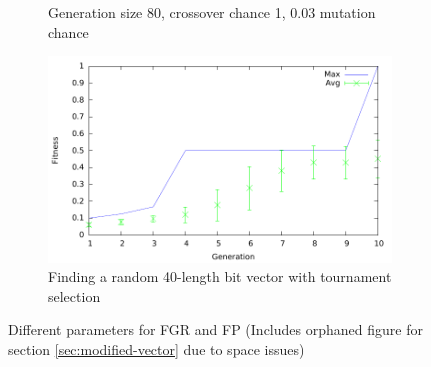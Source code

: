 \begin{figure}[H]
\begin{subfigure}[b]{0.5\textwidth}
                \caption{Generation size 80, crossover chance 1, 0.03 mutation chance}
                \label{fig:mouse}
        \end{subfigure}%
		\begin{subfigure}[b]{0.5\textwidth}
			\includegraphics[width=\textwidth]{../results/40-random/random-with-tournament.pdf}
			\caption{Finding a random 40-length bit vector with tournament selection}
			\label{fig:random-tournament}
		\end{subfigure}
        \caption{Different parameters for FGR and FP (Includes orphaned figure for section \ref{sec:modified-vector} due to space issues)}
        \label{fig:fgp-fp-fitness-graphs}
\end{figure}